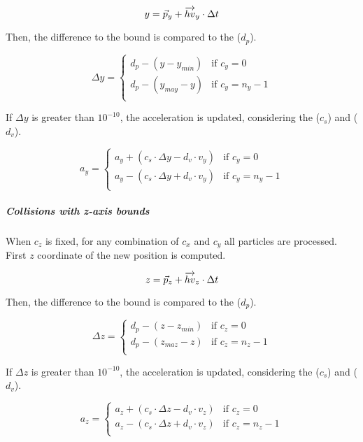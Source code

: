 \[
y = \vec{p}_y + \overrightarrow{hv}_y \cdot \Delta t \\
\]

Then, the difference to the bound is compared to the 
($d_p$).

\[
\Delta y = 
\begin{cases}
d_p - (y - y_{min}) & \text{if } c_y = 0\\
d_p - (y_{may} - y) & \text{if } c_y = n_y -1\\
\end{cases}
\]

If $\Delta y$ is greater than $10^{-10}$, the acceleration is updated,
considering the  ($c_s$) and 
($d_v$).

\[
a_y = 
\begin{cases}
  a_y + ( c_s \cdot \Delta y - d_v \cdot v_y )  & \text{if  } c_y = 0\\
  a_y - ( c_s \cdot \Delta y + d_v \cdot v_y ) & \text{if  } c_y = n_y-1\\
\end{cases}
\]

\subparagraph{Collisions with z-axis bounds}

When $c_z$ is fixed, for any combination of $c_x$ and $c_y$ all particles are
processed. First $z$ coordinate of the new position is computed.

\[
z = \vec{p}_z + \overrightarrow{hv}_z \cdot \Delta t \\
\]

Then, the difference to the bound is compared to the 
($d_p$).

\[
\Delta z = 
\begin{cases}
d_p - (z - z_{min}) & \text{if } c_z = 0\\
d_p - (z_{maz} - z) & \text{if } c_z = n_z -1\\
\end{cases}
\]

If $\Delta z$ is greater than $10^{-10}$, the acceleration is updated,
considering the  ($c_s$) and 
($d_v$).

\[
a_z = 
\begin{cases}
  a_z + ( c_s \cdot \Delta z - d_v \cdot v_z ) & \text{if  } c_z = 0\\
  a_z - ( c_s \cdot \Delta z + d_v \cdot v_z ) & \text{if  } c_z = n_z-1\\
\end{cases}
\]


